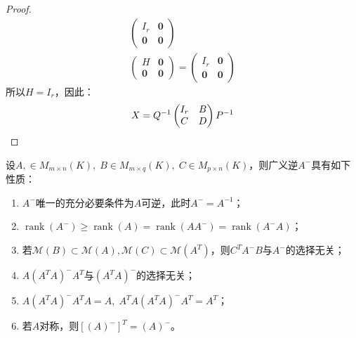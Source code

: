 \begin{proof}
\begin{gather*}
		\begin{pmatrix}
			I_r & \mathbf{0} \\
			\mathbf{0} & \mathbf{0}
		\end{pmatrix} \\
		\begin{pmatrix}
			H & \mathbf{0} \\
			\mathbf{0} & \mathbf{0}
		\end{pmatrix}
		=
		\begin{pmatrix}
			I_r & \mathbf{0} \\
			\mathbf{0} & \mathbf{0}
		\end{pmatrix}
	\end{gather*}
	所以$H=I_r$，因此：
	\begin{equation*}
		X=Q^{-1}
		\begin{pmatrix}
			I_r & B \\
			C & D
		\end{pmatrix}
		P^{-1}\qedhere
	\end{equation*}
\end{proof}
\begin{property}\label{prop:A-}
	设$A,\in M_{m\times n}(K),\;B\in M_{m\times q}(K),\;C\in M_{p\times n}(K)$，则广义逆$A^-$具有如下性质：
	\begin{enumerate}
		\item $A^-$唯一的充分必要条件为$A$可逆，此时$A^-=A^{-1}$；
		\item $\operatorname{rank}(A^-)\geqslant\operatorname{rank}(A)=\operatorname{rank}(AA^-)=\operatorname{rank}(A^-A)$；
		\item 若$\mathcal{M}(B)\subset\mathcal{M}(A),\mathcal{M}(C)\subset\mathcal{M}(A^T)$，则$C^TA^-B$与$A^-$的选择无关；
		\item $A(A^TA)^-A^T$与$(A^TA)^-$的选择无关；
		\item $A(A^TA)^-A^TA=A,\;A^TA(A^TA)^-A^T=A^T$；
		\item 若$A$对称，则$[(A)^-]^T=(A)^-$。
	\end{enumerate}
\end{property}
